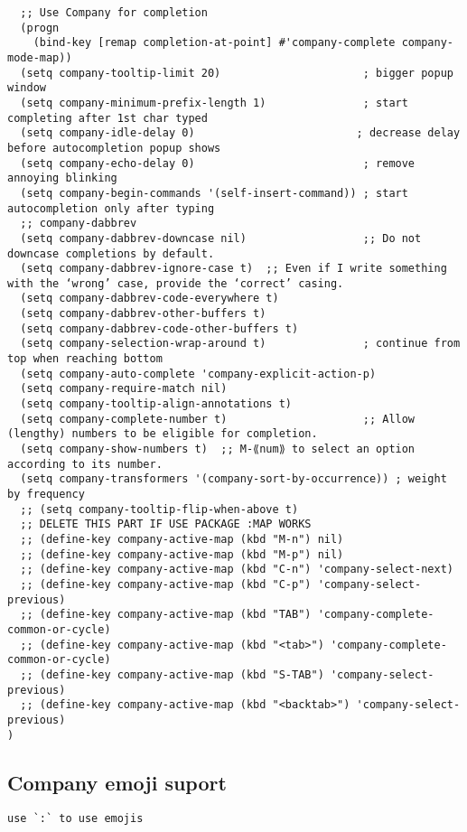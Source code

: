\documentclass[11pt]{article}
\begin{document}
\begin{verbatim}
  ;; Use Company for completion
  (progn
    (bind-key [remap completion-at-point] #'company-complete company-mode-map))
  (setq company-tooltip-limit 20)                      ; bigger popup window
  (setq company-minimum-prefix-length 1)               ; start completing after 1st char typed
  (setq company-idle-delay 0)                         ; decrease delay before autocompletion popup shows
  (setq company-echo-delay 0)                          ; remove annoying blinking
  (setq company-begin-commands '(self-insert-command)) ; start autocompletion only after typing
  ;; company-dabbrev
  (setq company-dabbrev-downcase nil)                  ;; Do not downcase completions by default.
  (setq company-dabbrev-ignore-case t)  ;; Even if I write something with the ‘wrong’ case, provide the ‘correct’ casing.
  (setq company-dabbrev-code-everywhere t)
  (setq company-dabbrev-other-buffers t)
  (setq company-dabbrev-code-other-buffers t)
  (setq company-selection-wrap-around t)               ; continue from top when reaching bottom
  (setq company-auto-complete 'company-explicit-action-p)
  (setq company-require-match nil)
  (setq company-tooltip-align-annotations t)
  (setq company-complete-number t)                     ;; Allow (lengthy) numbers to be eligible for completion.
  (setq company-show-numbers t)  ;; M-⟪num⟫ to select an option according to its number.
  (setq company-transformers '(company-sort-by-occurrence)) ; weight by frequency
  ;; (setq company-tooltip-flip-when-above t)
  ;; DELETE THIS PART IF USE PACKAGE :MAP WORKS
  ;; (define-key company-active-map (kbd "M-n") nil)
  ;; (define-key company-active-map (kbd "M-p") nil)
  ;; (define-key company-active-map (kbd "C-n") 'company-select-next)
  ;; (define-key company-active-map (kbd "C-p") 'company-select-previous)
  ;; (define-key company-active-map (kbd "TAB") 'company-complete-common-or-cycle)
  ;; (define-key company-active-map (kbd "<tab>") 'company-complete-common-or-cycle)
  ;; (define-key company-active-map (kbd "S-TAB") 'company-select-previous)
  ;; (define-key company-active-map (kbd "<backtab>") 'company-select-previous)
)
\end{verbatim}

\subsection*{Company emoji suport}
\label{sec:org62a4b91}

\begin{verbatim}
use `:` to use emojis
\end{verbatim}
\end{document}
